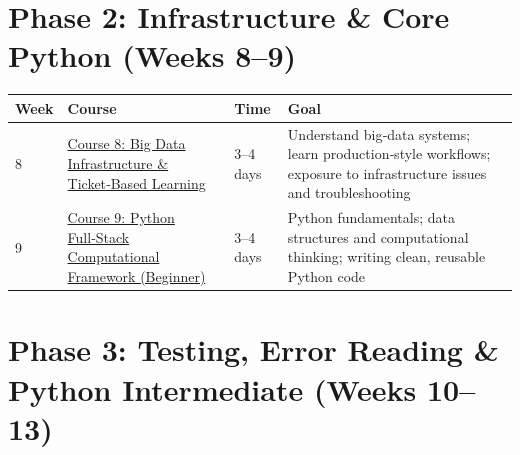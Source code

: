 \documentclass[12pt]{article}
\begin{document}
	\vspace{0.3cm}
	
	\section*{Phase 2: Infrastructure \& Core Python (Weeks 8–9)}
	
	\begin{tabularx}{\textwidth}{|X|p{3cm}|p{3cm}|X|}
		\hline
		\textbf{Week} & \textbf{Course} & \textbf{Time} & \textbf{Goal} \\
		\hline
		8 & \href{https://www.udemy.com/course/big-data-infra-admin-101-ticket-based-learning/}{Course 8: Big Data Infrastructure \& Ticket‑Based Learning} & 3–4 days & Understand big‑data systems; learn production‑style workflows; exposure to infrastructure issues and troubleshooting \\
		\hline
		9 & \href{https://www.udemy.com/course/python-full-stack-computational-framework-for-begineers-101/}{Course 9: Python Full‑Stack Computational Framework (Beginner)} & 3–4 days & Python fundamentals; data structures and computational thinking; writing clean, reusable Python code \\
		\hline
	\end{tabularx}
	
	\vspace{0.3cm}
	
	\section*{Phase 3: Testing, Error Reading \& Python Intermediate (Weeks 10–13)}
	
\end{document}
